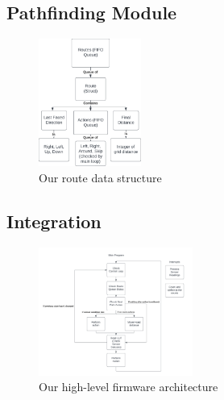 \documentclass[conference]{IEEEtran}
\begin{document}
\subsection{Pathfinding Module}

\begin{figure}[H]
	\centerline{\includegraphics[width=0.3\textwidth]{pathfinding-route-struct.png}}
	\caption{Our route data structure}
	\label{fig:pathfinding-route-struct}
\end{figure}

\subsection{Integration}

\begin{figure}[H]
	\centerline{\includegraphics[width=0.45\textwidth]{integration-flowchart.png}}
	\caption{Our high-level firmware architecture}
	\label{fig:integration-flowchart}
\end{figure}
\end{document}
